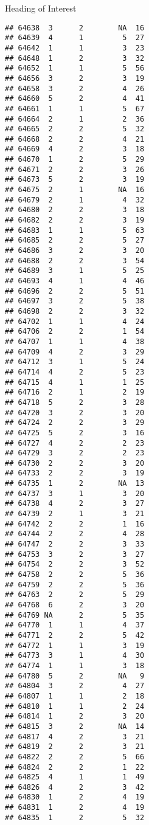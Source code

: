 \documentclass[
  ignorenonframetext,
]{beamer}
\begin{document}
\begin{frame}[fragile]{Heading of Interest}
\begin{verbatim}
## 64638  3      2        NA  16
## 64639  4      1         5  27
## 64642  1      1         3  23
## 64648  1      2         3  32
## 64652  1      1         5  56
## 64656  3      2         3  19
## 64658  3      2         4  26
## 64660  5      2         4  41
## 64661  1      1         5  67
## 64664  2      1         2  36
## 64665  2      2         5  32
## 64668  2      2         4  21
## 64669  4      2         3  18
## 64670  1      2         5  29
## 64671  2      2         3  26
## 64673  5      2         3  19
## 64675  2      1        NA  16
## 64679  2      1         4  32
## 64680  2      2         3  18
## 64682  2      2         3  19
## 64683  1      1         5  63
## 64685  2      2         5  27
## 64686  3      2         3  20
## 64688  2      2         3  54
## 64689  3      1         5  25
## 64693  4      1         4  46
## 64696  2      2         5  51
## 64697  3      2         5  38
## 64698  2      2         3  32
## 64702  1      1         4  24
## 64706  2      2         1  54
## 64707  1      1         4  38
## 64709  4      2         3  29
## 64712  3      1         5  24
## 64714  4      2         5  23
## 64715  4      1         1  25
## 64716  2      1         2  19
## 64718  5      2         3  28
## 64720  3      2         3  20
## 64724  2      2         3  29
## 64725  5      2         3  16
## 64727  4      2         2  23
## 64729  3      2         2  23
## 64730  2      2         3  20
## 64733  2      2         3  19
## 64735  1      2        NA  13
## 64737  3      1         3  20
## 64738  4      2         3  27
## 64739  2      1         3  21
## 64742  2      2         1  16
## 64744  2      2         4  28
## 64747  2      2         3  33
## 64753  3      2         3  27
## 64754  2      2         3  52
## 64758  2      2         5  36
## 64759  2      2         5  36
## 64763  2      2         5  29
## 64768  6      2         3  20
## 64769 NA      2         5  35
## 64770  1      1         4  37
## 64771  2      2         5  42
## 64772  1      1         3  19
## 64773  3      1         4  30
## 64774  1      1         3  18
## 64780  5      2        NA   9
## 64804  3      2         4  27
## 64807  1      1         2  18
## 64810  1      1         2  24
## 64814  1      2         3  20
## 64815  3      2        NA  14
## 64817  4      2         3  21
## 64819  2      2         3  21
## 64822  2      2         5  66
## 64824  2      2         1  22
## 64825  4      1         1  49
## 64826  4      2         3  42
## 64830  1      2         4  19
## 64831  1      2         4  19
## 64835  1      2         5  32

\end{verbatim}
\end{frame}
\end{document}
